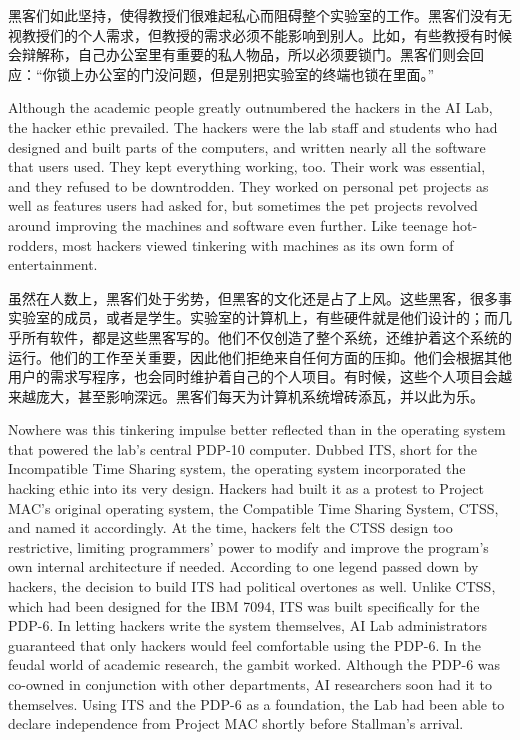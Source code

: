 \ifdefined\chs
黑客们如此坚持，使得教授们很难起私心而阻碍整个实验室的工作。黑客们没有无视教授们的个人需求，但教授的需求必须不能影响到别人。比如，有些教授有时候会辩解称，自己办公室里有重要的私人物品，所以必须要锁门。黑客们则会回应：“你锁上办公室的门没问题，但是别把实验室的终端也锁在里面。”
\fi

\ifdefined\eng
Although the academic people greatly outnumbered the hackers in the AI Lab, the hacker ethic prevailed. The hackers were the lab staff and students who had designed and built parts of the computers, and written nearly all the software that users used.  They kept everything working, too.  Their work was essential, and they refused to be downtrodden.  They worked on personal pet projects as well as features users had asked for, but sometimes the pet projects revolved around improving the machines and software even further. Like teenage hot-rodders, most hackers viewed tinkering with machines as its own form of entertainment.
\fi

\ifdefined\chs
虽然在人数上，黑客们处于劣势，但黑客的文化还是占了上风。这些黑客，很多事实验室的成员，或者是学生。实验室的计算机上，有些硬件就是他们设计的；而几乎所有软件，都是这些黑客写的。他们不仅创造了整个系统，还维护着这个系统的运行。他们的工作至关重要，因此他们拒绝来自任何方面的压抑。他们会根据其他用户的需求写程序，也会同时维护着自己的个人项目。有时候，这些个人项目会越来越庞大，甚至影响深远。黑客们每天为计算机系统增砖添瓦，并以此为乐。
\fi

\ifdefined\eng
Nowhere was this tinkering impulse better reflected than in the operating system that powered the lab's central PDP-10 computer. Dubbed ITS, short for the Incompatible Time Sharing system, the operating system incorporated the hacking ethic into its very design. Hackers had built it as a protest to Project MAC's original operating system, the Compatible Time Sharing System, CTSS, and named it accordingly. At the time, hackers felt the CTSS design too restrictive, limiting programmers' power to modify and improve the program's own internal architecture if needed. According to one legend passed down by hackers, the decision to build ITS had political overtones as well. Unlike CTSS, which had been designed for the IBM 7094, ITS was built specifically for the PDP-6. In letting hackers write the system themselves, AI Lab administrators guaranteed that only hackers would feel comfortable using the PDP-6. In the feudal world of academic research, the gambit worked. Although the PDP-6 was co-owned in conjunction with other departments, AI researchers soon had it to themselves.  Using ITS and the PDP-6 as a foundation, the Lab had been able to declare independence from Project MAC shortly before Stallman's arrival.
\fi

